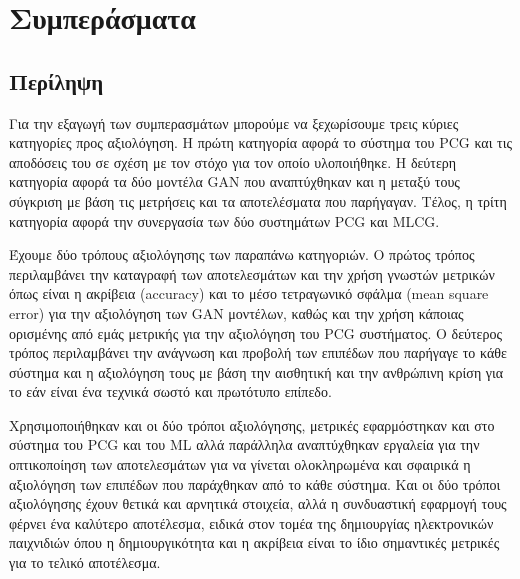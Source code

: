 \chapter{Συμπεράσματα}

\section{Περίληψη}
\par
Για την εξαγωγή των συμπερασμάτων μπορούμε να ξεχωρίσουμε τρεις κύριες κατηγορίες προς αξιολόγηση. Η πρώτη κατηγορία αφορά το σύστημα του PCG και τις αποδόσεις του σε σχέση με τον στόχο για τον οποίο υλοποιήθηκε. Η δεύτερη κατηγορία αφορά τα δύο μοντέλα GAN που αναπτύχθηκαν και η μεταξύ τους σύγκριση με βάση τις μετρήσεις και τα αποτελέσματα που παρήγαγαν. Τέλος, η τρίτη κατηγορία αφορά την συνεργασία των δύο συστημάτων PCG και MLCG.
\par
Έχουμε δύο τρόπους αξιολόγησης των παραπάνω κατηγοριών. Ο πρώτος τρόπος περιλαμβάνει την καταγραφή των αποτελεσμάτων και την χρήση γνωστών μετρικών όπως είναι η ακρίβεια (accuracy) και το μέσο τετραγωνικό σφάλμα (mean square error) για την αξιολόγηση των GAN μοντέλων, καθώς και την χρήση κάποιας ορισμένης από εμάς μετρικής για την αξιολόγηση του PCG συστήματος. Ο δεύτερος τρόπος περιλαμβάνει την ανάγνωση και προβολή των επιπέδων που παρήγαγε το κάθε σύστημα και η αξιολόγηση τους με βάση την αισθητική και την ανθρώπινη κρίση για το εάν είναι ένα τεχνικά σωστό και πρωτότυπο επίπεδο.
\par
Χρησιμοποιήθηκαν και οι δύο τρόποι αξιολόγησης, μετρικές εφαρμόστηκαν και στο σύστημα του PCG και του ML αλλά παράλληλα αναπτύχθηκαν εργαλεία για την οπτικοποίηση των αποτελεσμάτων για να γίνεται ολοκληρωμένα και σφαιρικά η αξιολόγηση των επιπέδων που παράχθηκαν από το κάθε σύστημα. Και οι δύο τρόποι αξιολόγησης έχουν θετικά και αρνητικά στοιχεία, αλλά η συνδυαστική εφαρμογή τους φέρνει ένα καλύτερο αποτέλεσμα, ειδικά στον τομέα της δημιουργίας ηλεκτρονικών παιχνιδιών όπου η δημιουργικότητα και η ακρίβεια είναι το ίδιο σημαντικές μετρικές για το τελικό αποτέλεσμα.


